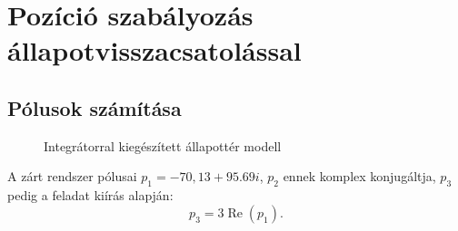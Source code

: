 \section{Pozíció szabályozás állapotvisszacsatolással}

\subsection{Pólusok számítása}

\begin{figure}[H]
    \centering
	\caption{Integrátorral kiegészített állapottér modell}
	\label{fig:6a_allapotter_hatasvazlat_jav}
\end{figure}


A zárt rendszer pólusai $p_1 = -70,13 + 95.69i$, $p_2$ ennek komplex konjugáltja, $p_3$ pedig a feladat kiírás alapján:
\begin{equation}
	p_3 = 3\operatorname{Re}(p_1).
\end{equation}


